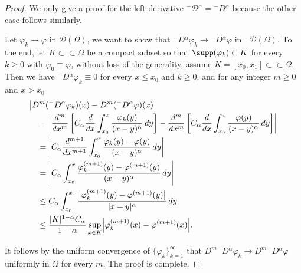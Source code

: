 \documentclass[leqno,final]{siamltex}
\numberwithin{equation}{section}
\renewcommand{\(}{\bigl(}
\renewcommand{\)}{\bigr)}
\begin{document}
\begin{proof}
We only give a proof for the left derivative ${^{-}}{\mathcal{D}}{^{\alpha}} = {^{-}}{D}{^{\alpha}}$ because the 
other case follows similarly.  

Let $\varphi_k \rightarrow \varphi$ in $\mathscr{D}(\Omega)$,  we want to show that ${^{-}}{{D}}{^{\alpha}} \varphi_k \rightarrow {^{-}}{{D}}{^{\alpha}} \varphi$ in ${^{-}}{\mathscr{D}}(\Omega) $. To the end, let $K \subset\subset  \Omega$ be a compact subset 
so that $\supp(\varphi_k) \subset K$ for every $k \geq 0$ with $\varphi_0\equiv \varphi$, without loss of the generality, assume 
$K=[x_0 , x_1] \subset\subset  \Omega$. Then we have ${^{-}}{D}{^{\alpha}} \varphi_k \equiv 0$ 
for every $x \leq x_0$ and $k \geq 0$, and for any integer $m\geq 0$ and $x > x_0$
        \begin{align*}
            &\bigl|D^m ({^{-}}{D}{^{\alpha}} \varphi_k) (x) - D^m ({^{-}}{D}{^{\alpha}} \varphi)(x)\bigr|\\
            &\quad = \biggl| \dfrac{d^m}{dx^m} \left[ C_\alpha \dfrac{d}{dx} \int_{x_0}^{x} \dfrac{\varphi_k(y)}{(x-y)^{\alpha}} \,dy \right] - \dfrac{d^m}{dx^m} \left[ C_\alpha \dfrac{d}{dx} \int_{x_0}^{x} \dfrac{\varphi(y)}{(x-y)^{\alpha}} \,dy \right] \biggr| \\ 
            & \quad = \left|C_\alpha \dfrac{d^{m+1}}{dx^{m+1}} \int_{x_0}^{x} \dfrac{\varphi_k(y) - \varphi(y)}{(x-y)^{\alpha}}\,dy\right| \\ 
            &\quad = \left|C_\alpha \int_{x_0}^{x} \dfrac{\varphi_k^{(m+1)}(y) - \varphi^{(m+1)}(y)}{(x-y)^{\alpha}}\,dy\right|\\
            &\quad \leq C_\alpha \int_{x_0}^{x_1} 
            \dfrac{ \bigl|\varphi_k^{(m+1)}(y) - \varphi^{(m+1)}(y)\bigr|}{|x-y|^\alpha}\,dy\\
            &\quad \leq \dfrac{|K|^{1-\alpha}C_\alpha}{1-\alpha} \sup_{x\in K}\Bigl|\varphi_k^{(m+1)}(x)- \varphi^{(m+1)}(x)\Bigr|.
        \end{align*}
         
        It follows by the uniform convergence of $\{\varphi_k\}_{k=1}^{\infty}$ that 
        $D^m {^{-}}{{D}}{^{\alpha}}\varphi_k \rightarrow D^m {^{-}}{{D}}{^{\alpha}} \varphi$ uniformly in $\Omega$ for every $m$.  The proof is complete.
    \end{proof}
\end{document}
